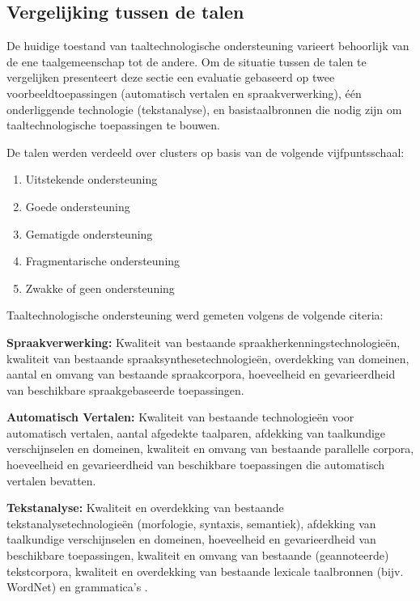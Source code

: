 \documentclass[]{../../metanetpaper}
\begin{document}
\begin{multicols}{2}
\subsection{Vergelijking tussen de talen}

De huidige toestand van taaltechnologische ondersteuning  varieert behoorlijk van de ene taalgemeenschap tot de andere. Om de situatie tussen de talen te vergelijken presenteert deze sectie een evaluatie gebaseerd op twee voorbeeldtoepassingen (automatisch vertalen en spraakverwerking), {\'e}{\'e}n onderliggende technologie (tekstanalyse), en basistaalbronnen die nodig zijn om taaltechnologische toepassingen te bouwen.

De talen werden verdeeld over clusters op basis van de volgende vijfpuntsschaal:

\begin{enumerate}
\item Uitstekende ondersteuning
\item Goede ondersteuning
\item Gematigde ondersteuning
\item  Fragmentarische ondersteuning
\item Zwakke of geen ondersteuning
\end{enumerate}

Taaltechnologische ondersteuning werd gemeten volgens de volgende citeria:

\textbf{Spraakverwerking:} Kwaliteit van bestaande spraakherkenningstechnologie{\"e}n, kwaliteit van bestaande spraaksynthesetechnologie{\"e}n, overdekking van domeinen, aantal en omvang van bestaande spraakcorpora, hoeveelheid en gevarieerdheid van beschikbare spraakgebaseerde toepassingen.

\textbf{Automatisch Vertalen:} Kwaliteit van bestaande technologie{\"e}n voor automatisch vertalen, aantal afgedekte taalparen, afdekking van taalkundige verschijnselen en domeinen, kwaliteit en omvang van bestaande parallelle corpora, hoeveelheid en gevarieerdheid van beschikbare  toepassingen die automatisch vertalen bevatten.

\textbf{Tekstanalyse:} Kwaliteit en overdekking van bestaande tekstanalysetechnologie{\"e}n (morfologie, syntaxis, semantiek), afdekking van taalkundige verschijnselen en domeinen, hoeveelheid en gevarieerdheid van beschikbare  toepassingen, kwaliteit en omvang van bestaande (geannoteerde) tekstcorpora, kwaliteit en overdekking van bestaande lexicale taalbronnen (bijv. WordNet) en grammatica's .


\end{multicols}
\end{document}
